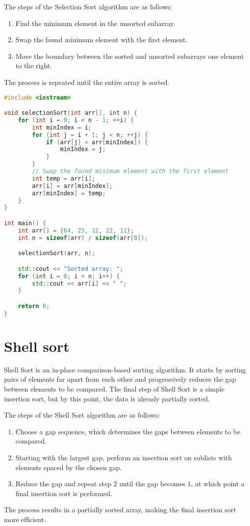 \documentclass{article}
\begin{document}
\begin{center}
    The steps of the Selection Sort algorithm are as follows:
\begin{enumerate}
    \item Find the minimum element in the unsorted subarray.
    \item Swap the found minimum element with the first element.
    \item Move the boundary between the sorted and unsorted subarrays one element to the right.
\end{enumerate}

The process is repeated until the entire array is sorted.
\end{center}
\begin{lstlisting}[language=C++, caption={Selection Sort in C++},label=selection-sort]
#include <iostream>

void selectionSort(int arr[], int n) {
    for (int i = 0; i < n - 1; ++i) {
        int minIndex = i;
        for (int j = i + 1; j < n; ++j) {
            if (arr[j] < arr[minIndex]) {
                minIndex = j;
            }
        }
        // Swap the found minimum element with the first element
        int temp = arr[i];
        arr[i] = arr[minIndex];
        arr[minIndex] = temp;
    }
}

int main() {
    int arr[] = {64, 25, 12, 22, 11};
    int n = sizeof(arr) / sizeof(arr[0]);

    selectionSort(arr, n);

    std::cout << "Sorted array: ";
    for (int i = 0; i < n; i++) {
        std::cout << arr[i] << " ";
    }

    return 0;
}
\end{lstlisting}

\section{Shell sort}

Shell Sort is an in-place comparison-based sorting algorithm. It starts by sorting pairs of elements far apart from each other and progressively reduces the gap between elements to be compared. The final step of Shell Sort is a simple insertion sort, but by this point, the data is already partially sorted.

\begin{center}
    The steps of the Shell Sort algorithm are as follows:
    \begin{enumerate}
        \item Choose a gap sequence, which determines the gaps between elements to be compared.
        \item Starting with the largest gap, perform an insertion sort on sublists with elements spaced by the chosen gap.
        \item Reduce the gap and repeat step 2 until the gap becomes 1, at which point a final insertion sort is performed.
    \end{enumerate}

    The process results in a partially sorted array, making the final insertion sort more efficient.
\end{center}
\end{document}
